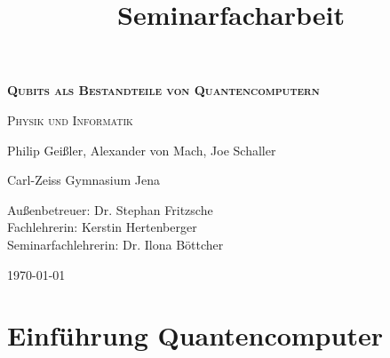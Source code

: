 \documentclass[12pt]{report}
\begin{document}

%

\title{\fontsize{100}{60}\selectfont{}\textbf{Seminarfacharbeit}}
\date{}
\maketitle

\newpage
\newpage

\begin{titlepage}
	{\scshape\large \quad \par}
	\centering
	\vspace{3cm}
	{\scshape\Huge\bfseries Qubits als Bestandteile von Quantencomputern \par}
	\vspace{1cm}
	{\scshape\large Physik und Informatik \par}
	\vspace{1cm}
	{\Large Philip Geißler, Alexander von Mach, Joe Schaller \par}
	\vspace{2cm}
	{\large Carl-Zeiss Gymnasium Jena\par}
	\vspace{0.7cm}
	{\large Außenbetreuer: Dr. Stephan Fritzsche \\
	\hspace{2.1mm} Fachlehrerin: Kerstin Hertenberger\\
	\hspace{-20mm} Seminarfachlehrerin: Dr. Ilona Böttcher\par}
	\vfill
	\today
\end{titlepage}

\tableofcontents

\chapter{Einführung Quantencomputer}			%
\end{document}
